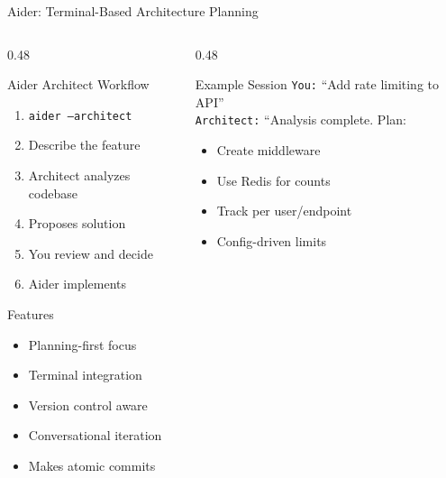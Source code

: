 \documentclass[aspectratio=169,10pt]{beamer}
\begin{document}
\begin{frame}{Aider: Terminal-Based Architecture Planning}
    \begin{columns}[T]
        \begin{column}{0.48\textwidth}
            \begin{block}{Aider Architect Workflow}
                \begin{enumerate}
                    \item \texttt{aider --architect}
                    \item Describe the feature
                    \item Architect analyzes codebase
                    \item Proposes solution
                    \item You review and decide
                    \item Aider implements
                \end{enumerate}
            \end{block}
            \begin{exampleblock}{Features}
                \begin{itemize}
                    \item Planning-first focus
                    \item Terminal integration
                    \item Version control aware
                    \item Conversational iteration
                    \item Makes atomic commits
                \end{itemize}
            \end{exampleblock}
        \end{column}
        \begin{column}{0.48\textwidth}
            \begin{block}{Example Session}
                \texttt{You:} ``Add rate limiting to API''\\[0.2cm]
                \texttt{Architect:} ``Analysis complete. Plan:
                \begin{itemize}
                    \item Create middleware
                    \item Use Redis for counts
                    \item Track per user/endpoint
                    \item Config-driven limits

\end{itemize}
\end{block}
\end{column}
\end{columns}
\end{frame}
\end{document}
